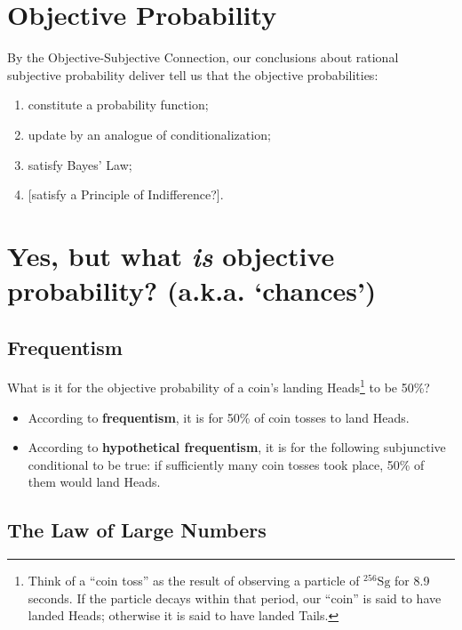\documentclass[12pt]{extarticle}
\begin{document}
\section{Objective Probability}

By the Objective-Subjective Connection, our conclusions about rational subjective probability deliver tell us that the objective probabilities: 


\begin{enumerate}
\item constitute a probability function;

\item update by an analogue of conditionalization; 

\item satisfy Bayes' Law;

\item {[satisfy a Principle of Indifference?]}.

\end{enumerate}

\section{Yes, but what \emph{is} objective probability? (a.k.a. `chances')}

\subsection{Frequentism}


What is it for the objective probability of a coin's landing Heads\footnote{Think of a ``coin toss'' as the result of observing a particle of $^{256}\mbox{Sg}$ for 8.9 seconds. If the particle decays within that period, our ``coin'' is said to have landed Heads; otherwise it is said to have landed Tails. } to be 50\%?

\begin{itemize}

\item According to \textbf{frequentism},  it is for 50\% of coin tosses to land Heads.

\item According to \textbf{hypothetical frequentism}, it is for the following subjunctive conditional to be true: if sufficiently many coin tosses took place, 50\% of them would land Heads.


\end{itemize}
\subsection{The Law of Large Numbers}
\end{document}
